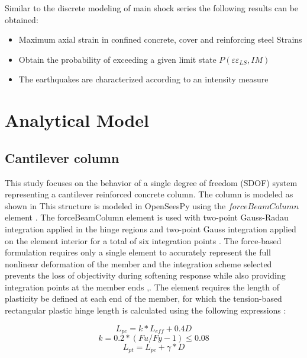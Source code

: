 %

Similar to the discrete modeling of main shock series the following results can be obtained:

\begin{itemize}
	\item Maximum axial strain in confined concrete, cover and reinforcing steel 
Strains
	\item Obtain the probability of exceeding a given limit state $P(\varepsilon\varepsilon_{LS},IM)$
	\item The earthquakes are characterized according to an intensity measure

\end{itemize}

\section{Analytical Model}

\subsection{Cantilever column}
This study focuses on the behavior of a single degree of freedom (SDOF) system representing a cantilever reinforced concrete column. The column is modeled as shown in  This structure is modeled in OpenSeesPy \cite{McKenna2010}\cite{Zhu2018} using the $forceBeamColumn$ element \cite{Scott}. The forceBeamColumn element is used with two-point Gauss-Radau integration applied in the hinge regions and two-point Gauss integration applied on the element interior for a total of six integration points \cite{Scott}. The force-based formulation requires only a single element to accurately represent the full nonlinear deformation of the member and the integration scheme selected prevents the loss of objectivity during softening response while also providing integration points at the member ends \cite{Calabrese2010},\cite{Scott}. The element requires the length of plasticity be defined at each end of the member, for which the tension-based rectangular plastic hinge length is calculated using the following expressions \cite{Goodnight2013}:

\begin{equation}
    L_{pc}=k*L_{eff} + 0.4D
    \label{eq:LP_Comp}
\end{equation}
\begin{equation}
	k=0.2*(Fu/Fy - 1) \leqslant 0.08
	\label{eq:K_Lp}
\end{equation}
\begin{equation}
    L_{pt}=L_{pc}+\gamma*D
    \label{eq:LP_Tension}
\end{equation}

